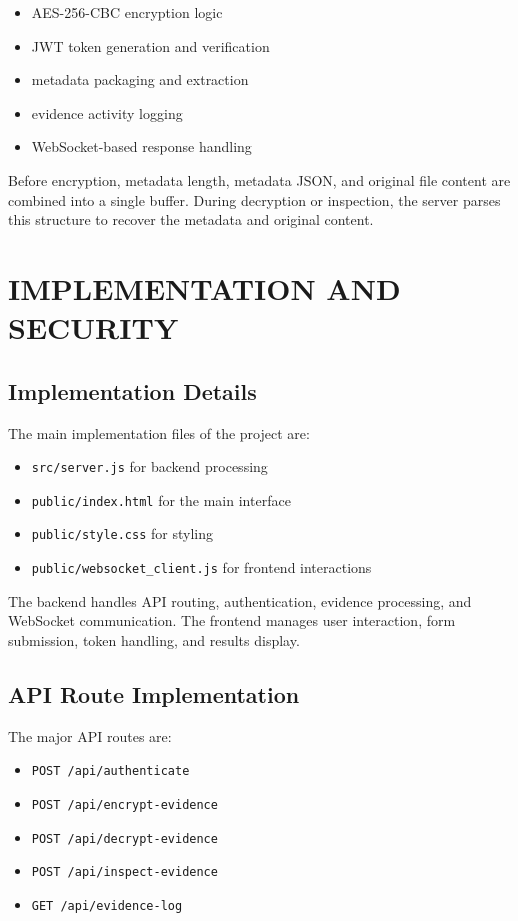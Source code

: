 \documentclass[12pt,a4paper]{report}
\begin{document}
\begin{itemize}
\item AES-256-CBC encryption logic
\item JWT token generation and verification
\item metadata packaging and extraction
\item evidence activity logging
\item WebSocket-based response handling
\end{itemize}

Before encryption, metadata length, metadata JSON, and original file content are combined into a single buffer. During decryption or inspection, the server parses this structure to recover the metadata and original content.

\chapter{IMPLEMENTATION AND SECURITY}

\section{Implementation Details}
The main implementation files of the project are:

\begin{itemize}
\item \texttt{src/server.js} for backend processing
\item \texttt{public/index.html} for the main interface
\item \texttt{public/style.css} for styling
\item \texttt{public/websocket\_client.js} for frontend interactions
\end{itemize}

The backend handles API routing, authentication, evidence processing, and WebSocket communication. The frontend manages user interaction, form submission, token handling, and results display.

\section{API Route Implementation}
The major API routes are:

\begin{itemize}
\item \texttt{POST /api/authenticate}
\item \texttt{POST /api/encrypt-evidence}
\item \texttt{POST /api/decrypt-evidence}
\item \texttt{POST /api/inspect-evidence}
\item \texttt{GET /api/evidence-log}
\end{itemize}
\end{document}
